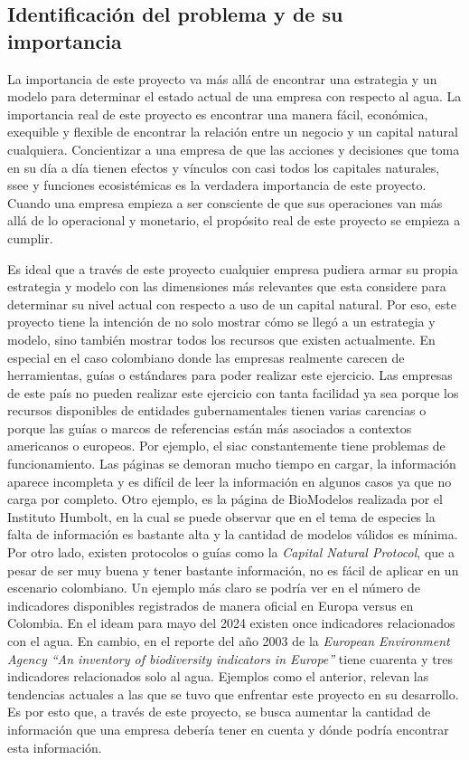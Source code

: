 \subsection{Identificación del problema y de su importancia} \label{subsec:identificacion-problema-importancia}
La importancia de este proyecto va más allá de encontrar una estrategia y un modelo para determinar el estado actual de una empresa con respecto al agua. La importancia real de este proyecto es encontrar una manera fácil, económica, exequible y flexible de encontrar la relación entre un negocio y un capital natural cualquiera. Concientizar a una empresa de que las acciones y decisiones que toma en su día a día tienen efectos y vínculos con casi todos los capitales naturales, \acrshort{ssee} y funciones ecosistémicas es la verdadera importancia de este proyecto. Cuando una empresa empieza a ser consciente de que sus operaciones van más allá de lo operacional y monetario, el propósito real de este proyecto se empieza a cumplir. 

\hfill

Es ideal que a través de este proyecto cualquier empresa pudiera armar su propia estrategia y modelo con las dimensiones más relevantes que esta considere para determinar su nivel actual con respecto a uso de un capital natural. Por eso, este proyecto tiene la intención de no solo mostrar cómo se llegó a un estrategia y modelo, sino también mostrar todos los recursos que existen actualmente. En especial en el caso colombiano donde las empresas realmente carecen de herramientas, guías o estándares para poder realizar este ejercicio. Las empresas de este país no pueden realizar este ejercicio con tanta facilidad ya sea porque los recursos disponibles de entidades gubernamentales tienen varias carencias o porque las guías o marcos de referencias están más asociados a contextos americanos o europeos. Por ejemplo, el \acrfull{siac} constantemente tiene problemas de funcionamiento. Las páginas se demoran mucho tiempo en cargar, la información aparece incompleta y es difícil de leer la información en algunos casos ya que no carga por completo.  Otro ejemplo, es la página de BioModelos realizada por el Instituto Humbolt, en la cual se puede observar que en el tema de especies la falta de información es bastante alta y la cantidad de modelos válidos es mínima. Por otro lado, existen protocolos o guías como la \textit{Capital Natural Protocol}, que a pesar de ser muy buena y tener bastante información, no es fácil de aplicar en un escenario colombiano. Un ejemplo más claro se podría ver en el número de indicadores disponibles registrados de manera oficial en Europa versus en Colombia. En el \acrfull{ideam} para mayo del 2024 existen once indicadores relacionados con el agua. En cambio, en el reporte del año 2003 de la \textit{European Environment Agency “An inventory of biodiversity indicators in Europe”} tiene cuarenta y tres indicadores relacionados solo al agua. Ejemplos como el anterior, relevan las tendencias actuales a las que se tuvo que enfrentar este proyecto en su desarrollo. Es por esto que, a través de este proyecto, se busca aumentar la cantidad de información que una empresa debería tener en cuenta y dónde podría encontrar esta información.

